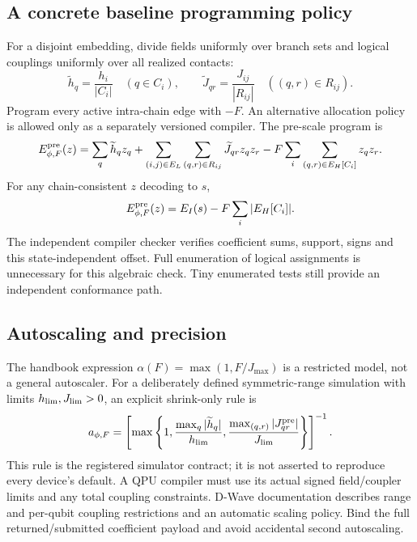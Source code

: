 \subsection{A concrete baseline programming policy}
For a disjoint embedding, divide fields uniformly over branch sets and logical couplings uniformly over all realized contacts:
\begin{equation}
\widetilde h_q=\frac{h_i}{|C_i|}\quad(q\in C_i),\qquad
\widetilde J_{qr}=\frac{J_{ij}}{|R_{ij}|}\quad((q,r)\in R_{ij}).
\end{equation}
Program every active intra-chain edge with $-F$. An alternative allocation policy is allowed only as a separately versioned compiler. The pre-scale program is
\begin{equation}
E^{\rm pre}_{\phi,F}(z)=\sum_q\widetilde h_qz_q+
\sum_{(i,j)\in E_L}\sum_{(q,r)\in R_{ij}}\widetilde J_{qr}z_qz_r
-F\sum_i\sum_{(q,r)\in E_H[C_i]}z_qz_r.
\end{equation}
For any chain-consistent $z$ decoding to $s$,
\begin{equation}
E^{\rm pre}_{\phi,F}(z)=E_I(s)-F\sum_i|E_H[C_i]|.
\label{eq:program-identity}
\end{equation}
The independent compiler checker verifies coefficient sums, support, signs and this state-independent offset. Full enumeration of logical assignments is unnecessary for this algebraic check. Tiny enumerated tests still provide an independent conformance path.

\subsection{Autoscaling and precision}
The handbook expression $\alpha(F)=\max(1,F/J_{\max})$ is a restricted model, not a general autoscaler. For a deliberately defined symmetric-range simulation with limits $h_{\rm lim},J_{\rm lim}>0$, an explicit shrink-only rule is
\begin{equation}
a_{\phi,F}=\left[\max\left\{1,
\frac{\max_q|\widetilde h_q|}{h_{\rm lim}},
\frac{\max_{(q,r)}|J^{\rm pre}_{qr}|}{J_{\rm lim}}\right\}\right]^{-1}.
\label{eq:scale}
\end{equation}
This rule is the registered simulator contract; it is not asserted to reproduce every device's default. A QPU compiler must use its actual signed field/coupler limits and any total coupling constraints. D-Wave documentation describes range and per-qubit coupling restrictions and an automatic scaling policy\cite{dwave2026}. Bind the full returned/submitted coefficient payload and avoid accidental second autoscaling.

